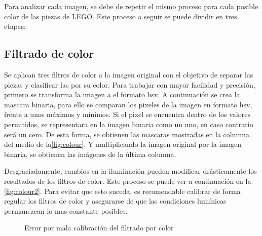 Para analizar cada imagen, se debe de repetir el mismo proceso para cada posible color de las piezas de LEGO. Este proceso a seguir se puede dividir en tres etapas:

\subsection{Filtrado de color}
Se aplican tres filtros de color a la imagen original con el objetivo de separar las piezas y clasificar las por su color. Para trabajar con mayor facilidad y precisión, primero se transforma la imagen a el formato hsv. A continuación se crea la mascara binaria, para ello se comparan los pixeles de la imagen en formato hsv, frente a unos máximos y mínimos. Si el pixel se encuentra dentro de los valores permitidos, se representara en la imagen binaria como un uno, en caso contrario será un cero. De esta forma, se obtienen las mascaras mostradas en la columna del medio de la\autoref{fig:colour}. Y multiplicando la imagen original por la imagen binaria, se obtienen las imágenes de la última columna.

Desgraciadamente, cambios en la iluminación pueden modificar drásticamente los resultados de los filtros de color. Este proceso se puede ver a continuación en la \autoref{fig:colour2}. Para evitar que esto suceda, es recomendable calibrar de forma regular los filtros de color y asegurarse de que las condiciones lumínicas permanezcan lo mas constante posibles.

\begin{figure}[ht]  %
  \hfill	
  \hfill	
\caption{Error por mala calibración del filtrado por color}
\label{fig:colour2}
\vspace{-5pt}
\end{figure}

